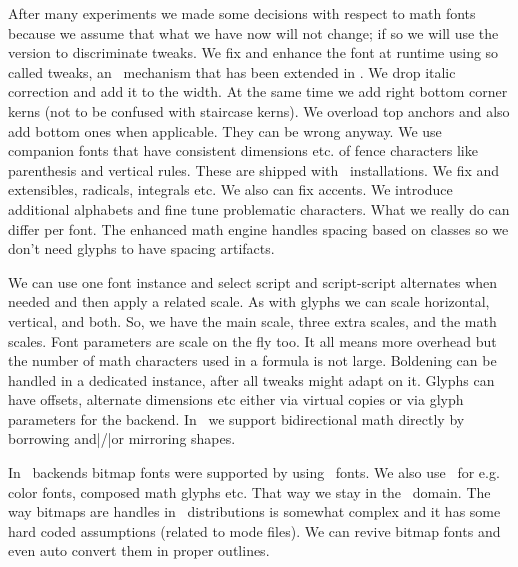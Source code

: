 \startitemize
\startitem
    After many experiments we made some decisions with respect to math fonts
    because we assume that what we have now will not change; if so we will
    use the version to discriminate tweaks.
\stopitem
\startitem
    We fix and enhance the font at runtime using so called tweaks, an \MKIV\
    mechanism that has been extended in \LMTX.
\stopitem
\startitem
    We drop italic correction and add it to the width. At the same time we add
    right bottom corner kerns (not to be confused with staircase kerns).
\stopitem
\startitem
    We overload top anchors and also add bottom ones when applicable. They can be
    wrong anyway.
\stopitem
\startitem
    We use companion fonts that have consistent dimensions etc. of fence characters
    like parenthesis and vertical rules. These are shipped with \CONTEXT\ installations.
\stopitem
\startitem
    We fix and extensibles, radicals, integrals etc. We also can fix accents.
\stopitem
\startitem
    We introduce additional alphabets and fine tune problematic characters. What we
    really do can differ per font.
\stopitem
\startitem
    The enhanced math engine handles spacing based on classes so we don't need
    glyphs to have spacing artifacts.
\stopitem
\stopitemize

\starttitle[title=Compact math]

\startitemize
\startitem
    We can use one font instance and select script and script-script alternates
    when needed and then apply a related scale.
\stopitem
\startitem
    As with glyphs we can scale horizontal, vertical, and both. So, we have the
    main scale, three extra scales, and the math scales.
\stopitem
\startitem
    Font parameters are scale on the fly too. It all means more overhead but the
    number of math characters used in a formula is not large.
\stopitem
\startitem
    Boldening can be handled in a dedicated instance, after all tweaks might
    adapt on it.
\stopitem
\startitem
    Glyphs can have offsets, alternate dimensions etc either via virtual copies
    or via glyph parameters for the backend.
\stopitem
\startitem
    In \CONTEXT\ we support bidirectional math directly by borrowing and|/|or
    mirroring shapes.
\stopitem
\stopitemize

\stoptitle

\starttitle[title=How about bitmaps]

\startitemize
\startitem
    In \TEX\ backends bitmap fonts were supported by using \TYPETHREE\ fonts.
\stopitem
\startitem
    We also use \TYPETHREE\ for e.g. color fonts, composed math glyphs etc. That way we
    stay in the \UNICODE\ domain.
\stopitem
\startitem
    The way bitmaps are handles in \TEX\ distributions is somewhat complex and it has
    some hard coded assumptions (related to mode files).
\stopitem
\startitem
    We can revive bitmap fonts and even auto convert them in proper outlines.
\stopitem
\stopitemize

